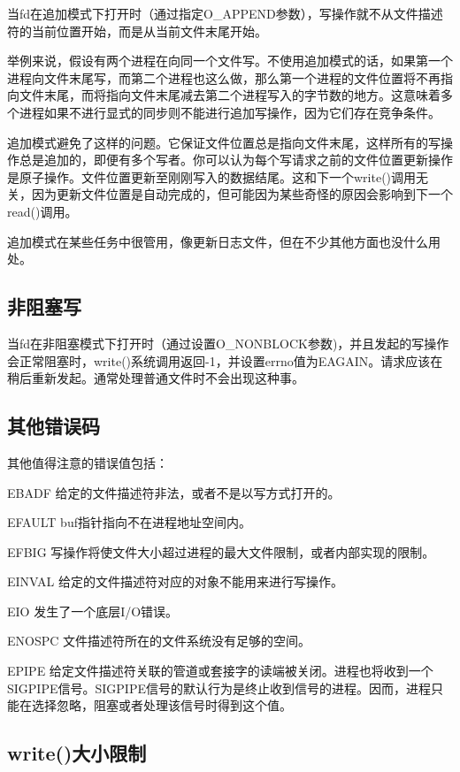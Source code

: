 当fd在追加模式下打开时（通过指定O\_APPEND参数），写操作就不从文件描述符的当前位置开始，而是从当前文件末尾开始。

举例来说，假设有两个进程在向同一个文件写。不使用追加模式的话，如果第一个进程向文件末尾写，而第二个进程也这么做，那么第一个进程的文件位置将不再指向文件末尾，而将指向文件末尾减去第二个进程写入的字节数的地方。这意味着多个进程如果不进行显式的同步则不能进行追加写操作，因为它们存在竞争条件。

追加模式避免了这样的问题。它保证文件位置总是指向文件末尾，这样所有的写操作总是追加的，即便有多个写者。你可以认为每个写请求之前的文件位置更新操作是原子操作。文件位置更新至刚刚写入的数据结尾。这和下一个write()调用无关，因为更新文件位置是自动完成的，但可能因为某些奇怪的原因会影响到下一个read()调用。

追加模式在某些任务中很管用，像更新日志文件，但在不少其他方面也没什么用处。

\subsection{非阻塞写}
当fd在非阻塞模式下打开时（通过设置O\_NONBLOCK参数)，并且发起的写操作会正常阻塞时，write()系统调用返回-1，并设置errno值为EAGAIN。请求应该在稍后重新发起。通常处理普通文件时不会出现这种事。 

\subsection{其他错误码}
其他值得注意的错误值包括：
\begin{eqlist*}
\item [EBADF]
给定的文件描述符非法，或者不是以写方式打开的。 
\item [EFAULT]
buf指针指向不在进程地址空间内。 
\item [EFBIG]
写操作将使文件大小超过进程的最大文件限制，或者内部实现的限制。 
\item [EINVAL]
给定的文件描述符对应的对象不能用来进行写操作。 
\item [EIO]
发生了一个底层I/O错误。 
\item [ENOSPC]
文件描述符所在的文件系统没有足够的空间。 
\item [EPIPE]
给定文件描述符关联的管道或套接字的读端被关闭。进程也将收到一个SIGPIPE信号。SIGPIPE信号的默认行为是终止收到信号的进程。因而，进程只能在选择忽略，阻塞或者处理该信号时得到这个值。 
\end{eqlist*}

\subsection{write()大小限制}

